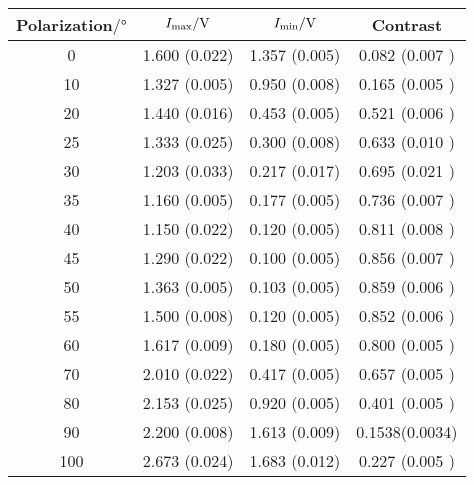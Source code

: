 \begin{table}[H]
	\centering
	\begin{tabular}{S[table-format=3.0] S S S[table-format=1.4(2)]}
		\toprule
		{Polarization$/\unit{\degree}$} & {$I_\t{max}/\unit{\volt}$} & {$I_\t{min}/\unit{\volt}$} & {Contrast}     \\
		                               & 1.600 (0.022)              & 1.357 (0.005)              & 0.082 (0.007 ) \\
		10                              & 1.327 (0.005)              & 0.950 (0.008)              & 0.165 (0.005 ) \\
		20                              & 1.440 (0.016)              & 0.453 (0.005)              & 0.521 (0.006 ) \\
		25                              & 1.333 (0.025)              & 0.300 (0.008)              & 0.633 (0.010 ) \\
		30                              & 1.203 (0.033)              & 0.217 (0.017)              & 0.695 (0.021 ) \\
		35                              & 1.160 (0.005)              & 0.177 (0.005)              & 0.736 (0.007 ) \\
		40                              & 1.150 (0.022)              & 0.120 (0.005)              & 0.811 (0.008 ) \\
		45                              & 1.290 (0.022)              & 0.100 (0.005)              & 0.856 (0.007 ) \\
		50                              & 1.363 (0.005)              & 0.103 (0.005)              & 0.859 (0.006 ) \\
		55                              & 1.500 (0.008)              & 0.120 (0.005)              & 0.852 (0.006 ) \\
		60                              & 1.617 (0.009)              & 0.180 (0.005)              & 0.800 (0.005 ) \\
		70                              & 2.010 (0.022)              & 0.417 (0.005)              & 0.657 (0.005 ) \\
		80                              & 2.153 (0.025)              & 0.920 (0.005)              & 0.401 (0.005 ) \\
		90                              & 2.200 (0.008)              & 1.613 (0.009)              & 0.1538(0.0034) \\
		100                             & 2.673 (0.024)              & 1.683 (0.012)              & 0.227 (0.005 ) \\

\end{tabular}
\end{table}
